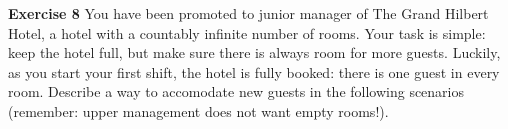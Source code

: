 \documentclass[12pt,oneside]{exam}
\newenvironment{exercise}[1]{\vspace{.1in}\noindent\textbf{Exercise #1 \hspace{.05em}}}{}
\begin{document}
\begin{exercise}{8}
You have been promoted to junior manager of The Grand Hilbert Hotel, a hotel with a countably infinite number of rooms. Your task is simple: keep the hotel full, but make sure there is always room for more guests. Luckily, as you start your first shift, the hotel is fully booked: there is one guest in every room. Describe a way to accomodate new guests in the following scenarios (remember: upper management does not want empty rooms!). 
\end{exercise}
\end{document}
